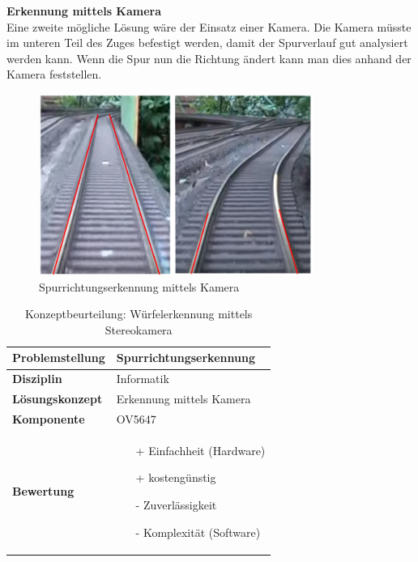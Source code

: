 \documentclass[../../main.tex]{subfiles}
\begin{document}
    \vspace{0.5cm}
    \textbf{Erkennung mittels Kamera}\\
    Eine zweite mögliche Lösung wäre der Einsatz einer Kamera. Die Kamera müsste im unteren Teil des Zuges befestigt
    werden, damit der Spurverlauf gut analysiert werden kann. Wenn die Spur nun die Richtung ändert kann man dies 
    anhand der Kamera feststellen.\\

    \begin{figure}[H] %
        \centering
        \includegraphics[width=0.8\textwidth]{spurrichtung_Kamera.png}
        \caption{Spurrichtungserkennung mittels Kamera}
    \end{figure}

    \begin{flushleft}
        \begin{table}[H]
        \begin{tabular}{ | l | p{11cm} |}
        \hline
        \textbf{Problemstellung} & Spurrichtungserkennung \\ \hline
        \textbf{Disziplin} & Informatik \\ \hline
        \textbf{Lösungskonzept} & Erkennung mittels Kamera \\ \hline
        \textbf{Komponente} & OV5647 \\ \hline
        \textbf{Bewertung} &  \begin{itemize}
                                \item[+] Einfachheit (Hardware)
                                \item[+] kostengünstig
                                \item[-] Zuverlässigkeit
                                \item[-] Komplexität (Software)   
                              \end{itemize} \\ \hline
        \end{tabular}
        \caption{Konzeptbeurteilung: Würfelerkennung mittels Stereokamera}
        \label{tab:konzept_wurfel_Stereokamera}
    \end{table}
    \end{flushleft}
\end{document}
